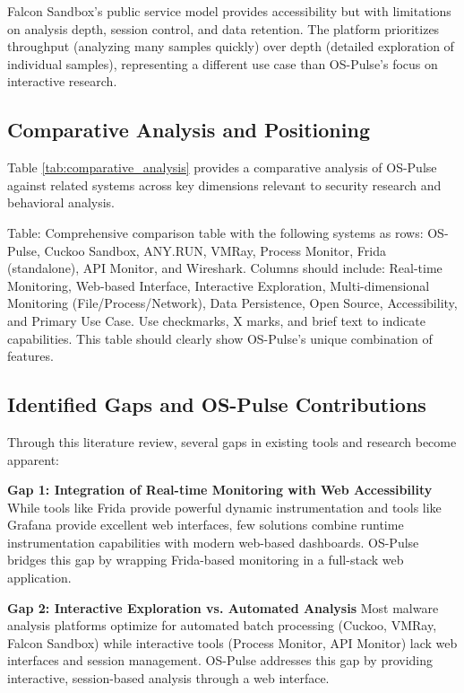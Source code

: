 Falcon Sandbox's public service model provides accessibility but with limitations on analysis depth, session control, and data retention. The platform prioritizes throughput (analyzing many samples quickly) over depth (detailed exploration of individual samples), representing a different use case than OS-Pulse's focus on interactive research.

\subsection{Comparative Analysis and Positioning}

Table \ref{tab:comparative_analysis} provides a comparative analysis of OS-Pulse against related systems across key dimensions relevant to security research and behavioral analysis.

{{Table: Comprehensive comparison table with the following systems as rows: OS-Pulse, Cuckoo Sandbox, ANY.RUN, VMRay, Process Monitor, Frida (standalone), API Monitor, and Wireshark. Columns should include: Real-time Monitoring, Web-based Interface, Interactive Exploration, Multi-dimensional Monitoring (File/Process/Network), Data Persistence, Open Source, Accessibility, and Primary Use Case. Use checkmarks, X marks, and brief text to indicate capabilities. This table should clearly show OS-Pulse's unique combination of features.}}

\subsection{Identified Gaps and OS-Pulse Contributions}

Through this literature review, several gaps in existing tools and research become apparent:

\textbf{Gap 1: Integration of Real-time Monitoring with Web Accessibility}
While tools like Frida provide powerful dynamic instrumentation and tools like Grafana provide excellent web interfaces, few solutions combine runtime instrumentation capabilities with modern web-based dashboards. OS-Pulse bridges this gap by wrapping Frida-based monitoring in a full-stack web application.

\textbf{Gap 2: Interactive Exploration vs. Automated Analysis}
Most malware analysis platforms optimize for automated batch processing (Cuckoo, VMRay, Falcon Sandbox) while interactive tools (Process Monitor, API Monitor) lack web interfaces and session management. OS-Pulse addresses this gap by providing interactive, session-based analysis through a web interface.

